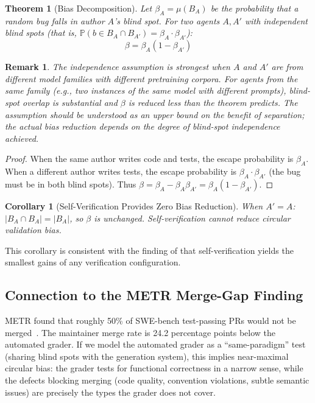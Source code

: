 \documentclass[11pt, a4paper, logo, copyright]{googledeepmind}
\newtheorem{theorem}{Theorem}[section]
\newtheorem{corollary}{Corollary}[section]
\newtheorem*{remark}{Remark}
\newcommand{\Prob}{\mathbb{P}}
\begin{document}
\begin{theorem}[Bias Decomposition]
\label{thm:bias}
Let $\beta_A = \mu(B_A)$ be the probability that a random bug falls in author $A$'s blind spot.
For two agents $A, A'$ with \emph{independent} blind spots (that is, $\Prob(b \in B_A \cap B_{A'}) = \beta_A \cdot \beta_{A'}$):
\begin{equation}
\beta = \beta_A(1 - \beta_{A'})
\end{equation}
\end{theorem}

\begin{remark}
The independence assumption is strongest when $A$ and $A'$ are from different model families with different pretraining corpora.
For agents from the same family (e.g., two instances of the same model with different prompts), blind-spot overlap is substantial and $\beta$ is reduced less than the theorem predicts.
The assumption should be understood as an upper bound on the benefit of separation; the actual bias reduction depends on the degree of blind-spot independence achieved.
\end{remark}

\begin{proof}
When the same author writes code and tests, the escape probability is $\beta_A$.
When a different author writes tests, the escape probability is $\beta_A \cdot \beta_{A'}$ (the bug must be in both blind spots).
Thus $\beta = \beta_A - \beta_A \beta_{A'} = \beta_A(1 - \beta_{A'})$.
\end{proof}

\begin{corollary}[Self-Verification Provides Zero Bias Reduction]
When $A' = A$: $|B_A \cap B_A| = |B_A|$, so $\beta$ is unchanged.
Self-verification cannot reduce circular validation bias.
\end{corollary}

This corollary is consistent with the finding of \citet{selfverification2025} that self-verification yields the smallest gains of any verification configuration.

\subsection{Connection to the METR Merge-Gap Finding}

METR found that roughly 50\% of SWE-bench test-passing PRs would not be merged~\citep{metr2026swebench}.
The maintainer merge rate is 24.2 percentage points below the automated grader.
If we model the automated grader as a ``same-paradigm'' test (sharing blind spots with the generation system), this implies near-maximal circular bias: the grader tests for functional correctness in a narrow sense, while the defects blocking merging (code quality, convention violations, subtle semantic issues) are precisely the types the grader does not cover.
\end{document}

